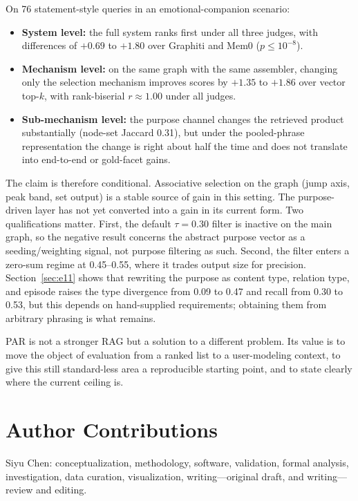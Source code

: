 \documentclass[11pt]{article}
\newif\ifchinaxiv
\begin{document}
On 76 statement-style queries in an emotional-companion scenario:

\begin{itemize}
  \item \textbf{System level:} the full system ranks first under all three judges, with
        differences of $+0.69$ to $+1.80$ over Graphiti and Mem0 ($p\le10^{-8}$).
  \item \textbf{Mechanism level:} on the same graph with the same assembler, changing only the
        selection mechanism improves scores by $+1.35$ to $+1.86$ over vector top-$k$, with
        rank-biserial $r\approx1.00$ under all judges.
  \item \textbf{Sub-mechanism level:} the purpose channel changes the retrieved product
        substantially (node-set Jaccard 0.31), but under the pooled-phrase representation the
        change is right about half the time and does not translate into end-to-end or gold-facet
        gains.
\end{itemize}

The claim is therefore conditional. Associative selection on the graph (jump axis, peak band,
set output) is a stable source of gain in this setting. The purpose-driven layer has not yet
converted into a gain in its current form. Two qualifications matter. First, the default
$\tau=0.30$ filter is inactive on the main graph, so the negative result concerns the abstract
purpose vector as a seeding/weighting signal, not purpose filtering as such. Second, the filter
enters a zero-sum regime at 0.45--0.55, where it trades output size for precision.
Section~\ref{sec:e11} shows that rewriting the purpose
as content type, relation type, and episode raises the type divergence from 0.09 to 0.47 and
recall from 0.30 to 0.53, but this depends on hand-supplied requirements; obtaining them from
arbitrary phrasing is what remains.

PAR is not a stronger RAG but a solution to a different problem. Its value is to move the object
of evaluation from a ranked list to a user-modeling context, to give this still standard-less
area a reproducible starting point, and to state clearly where the current ceiling is.

\ifchinaxiv
\section*{Author Contributions}
Siyu Chen: conceptualization, methodology, software, validation, formal analysis, investigation,
data curation, visualization, writing---original draft, and writing---review and editing.
\end{document}

